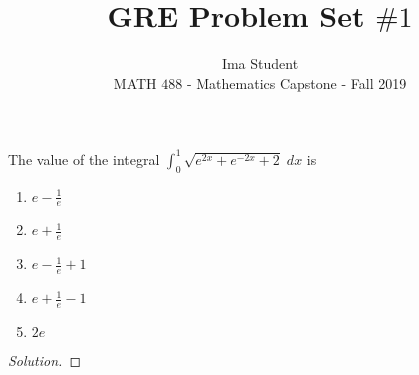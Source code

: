 \documentclass[letterpaper,12pt]{amsart}
\newenvironment{problem}[2][Problem]{\begin{trivlist}
\item[\hskip \labelsep {\bfseries #1}\hskip \labelsep {\bfseries #2.}]}{\end{trivlist}}
\newenvironment{solution}
  {\begin{proof}[Solution]}
  {\end{proof}}
\begin{document}
 
 
 
\title{GRE Problem Set $\#1$}%
\author{Ima Student\\ %
MATH $488$ - Mathematics Capstone - Fall 2019} 
 
\maketitle
 
\begin{problem}{2}
The value of the integral 
   $\displaystyle \int_0^1\sqrt{e^{2x}+e^{-2x}+2} \;dx$ is
 
    \vspace*{0.15cm}
    \begin{enumerate}[itemsep=0.15cm]
      \item $e-\frac{1}{e}$
      \item $e+\frac{1}{e}$
      \item $e-\frac{1}{e}+1$
      \item $e+\frac{1}{e}-1$
      \item $2e$
    \end{enumerate}
\end{problem}
\begin{solution}  %

\end{solution}
 
\end{document}
